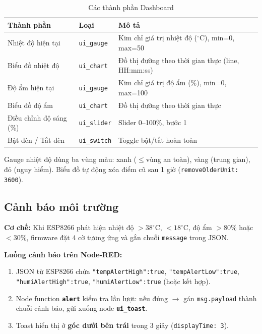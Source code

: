 \documentclass[13pt,a4paper]{article}
\newcommand{\code}[1]{\texttt{#1}}
\begin{document}
\begin{table}[htbp]
    \centering
    \caption{Các thành phần Dashboard}
    \label{tbl:dashboard}
    \begin{tabular}{|L{4cm}|C{2.5cm}|C{6cm}|}
        \hline
        \textbf{Thành phần} & \textbf{Loại} & \textbf{Mô tả} \\
        \hline
        Nhiệt độ hiện tại & \code{ui\_gauge} & Kim chỉ giá trị nhiệt độ ($^\circ$C), min=0, max=50 \\
        \hline
        Biểu đồ nhiệt độ & \code{ui\_chart} & Đồ thị đường theo thời gian thực (line, HH:mm:ss) \\
        \hline
        Độ ẩm hiện tại & \code{ui\_gauge} & Kim chỉ giá trị độ ẩm (\%), min=0, max=100 \\
        \hline
        Biểu đồ độ ẩm & \code{ui\_chart} & Đồ thị đường theo thời gian thực \\
        \hline
        Điều chỉnh độ sáng (\%) & \code{ui\_slider} & Slider 0--100\%, bước 1 \\
        \hline
        Bật đèn / Tắt đèn & \code{ui\_switch} & Toggle bật/tắt hoàn toàn \\
        \hline
    \end{tabular}
\end{table}

Gauge nhiệt độ dùng ba vùng màu: xanh ($\le$vùng an toàn), vàng (trung gian), đỏ (nguy hiểm). Biểu đồ tự động xóa điểm cũ sau 1 giờ (\code{removeOlderUnit: 3600}).

\subsection{Cảnh báo môi trường}
\label{sec:canhbao}

\textbf{Cơ chế:} Khi ESP8266 phát hiện nhiệt độ $> 38^\circ$C, $< 18^\circ$C, độ ẩm $> 80\%$ hoặc $< 30\%$, firmware đặt 4 cờ tương ứng và gắn chuỗi \code{message} trong JSON.

\textbf{Luồng cảnh báo trên Node-RED:}

\begin{enumerate}[label=\arabic*., leftmargin=1.5cm]
    \item JSON từ ESP8266 chứa \code{"tempAlertHigh":true}, \code{"tempAlertLow":true}, \code{"humiAlertHigh":true}, \code{"humiAlertLow":true} (hoặc kết hợp).
    \item Node function \textbf{\code{alert}} kiểm tra lần lượt: nếu đúng $\rightarrow$ gán \code{msg.payload} thành chuỗi cảnh báo, gửi xuống node \textbf{\code{ui\_toast}}.
    \item Toast hiển thị ở \textbf{góc dưới bên trái} trong 3 giây (\code{displayTime: 3}).
\end{enumerate}
\end{document}
